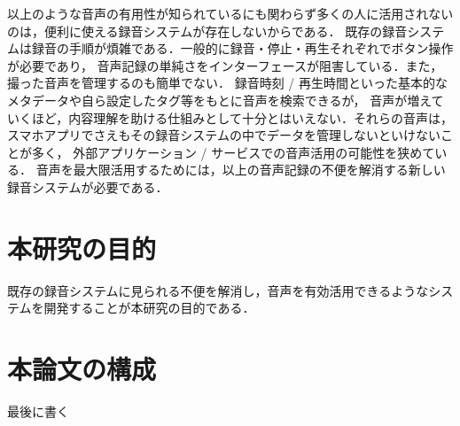 以上のような音声の有用性が知られているにも関わらず多くの人に活用されないのは，便利に使える録音システムが存在しないからである．
既存の録音システムは録音の手順が煩雑である．一般的に録音・停止・再生それぞれでボタン操作が必要であり，
音声記録の単純さをインターフェースが阻害している．また，撮った音声を管理するのも簡単でない．
録音時刻 / 再生時間といった基本的なメタデータや自ら設定したタグ等をもとに音声を検索できるが，
音声が増えていくほど，内容理解を助ける仕組みとして十分とはいえない．それらの音声は，
スマホアプリでさえもその録音システムの中でデータを管理しないといけないことが多く，
外部アプリケーション / サービスでの音声活用の可能性を狭めている．
音声を最大限活用するためには，以上の音声記録の不便を解消する新しい録音システムが必要である．

\section{本研究の目的}

 既存の録音システムに見られる不便を解消し，音声を有効活用できるようなシステムを開発することが本研究の目的である．

\section{本論文の構成}

最後に書く
